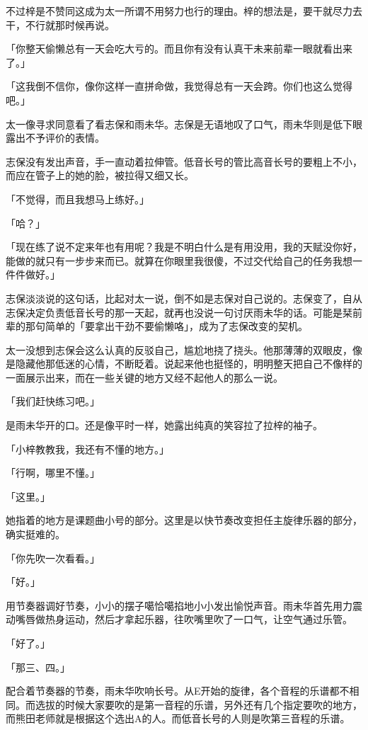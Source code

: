 \documentclass[UTF8]{ctexart}
\begin{document}
    不过梓是不赞同这成为太一所谓不用努力也行的理由。梓的想法是，要干就尽力去干，不行就那时候再说。

    「你整天偷懒总有一天会吃大亏的。而且你有没有认真干未来前辈一眼就看出来了。」

    「这我倒不信你，像你这样一直拼命做，我觉得总有一天会跨。你们也这么觉得吧。」

    太一像寻求同意看了看志保和雨未华。志保是无语地叹了口气，雨未华则是低下眼露出不予评价的表情。

    志保没有发出声音，手一直动着拉伸管。低音长号的管比高音长号的要粗上不小，而应在管子上的她的脸，被拉得又细又长。

    「不觉得，而且我想马上练好。」

    「哈？」

    「现在练了说不定来年也有用呢？我是不明白什么是有用没用，我的天赋没你好，能做的就只有一步步来而已。就算在你眼里我很傻，不过交代给自己的任务我想一件件做好。」

    志保淡淡说的这句话，比起对太一说，倒不如是志保对自己说的。志保变了，自从志保决定负责低音长号的那一天起，就再也没说一句讨厌雨未华的话。可能是栞前辈的那句简单的「要拿出干劲不要偷懒咯」，成为了志保改变的契机。

    太一没想到志保会这么认真的反驳自己，尴尬地挠了挠头。他那薄薄的双眼皮，像是隐藏他那低迷的心情，不断眨着。说起来他也挺怪的，明明整天把自己不像样的一面展示出来，而在一些关键的地方又经不起他人的那么一说。

    「我们赶快练习吧。」

    是雨未华开的口。还是像平时一样，她露出纯真的笑容拉了拉梓的袖子。

    「小梓教教我，我还有不懂的地方。」

    「行啊，哪里不懂。」

    「这里。」

    她指着的地方是课题曲小号的部分。这里是以快节奏改变担任主旋律乐器的部分，确实挺难的。

    「你先吹一次看看。」

    「好。」

    用节奏器调好节奏，小小的摆子噶恰噶掐地小小发出愉悦声音。雨未华首先用力震动嘴唇做热身运动，然后才拿起乐器，往吹嘴里吹了一口气，让空气通过乐管。

    「好了。」

    「那三、四。」

    配合着节奏器的节奏，雨未华吹响长号。从E开始的旋律，各个音程的乐谱都不相同。而选拔的时候大家要吹的是第一音程的乐谱，另外还有几个指定要吹的地方，而熊田老师就是根据这个选出A的人。而低音长号的人则是吹第三音程的乐谱。
\end{document}
